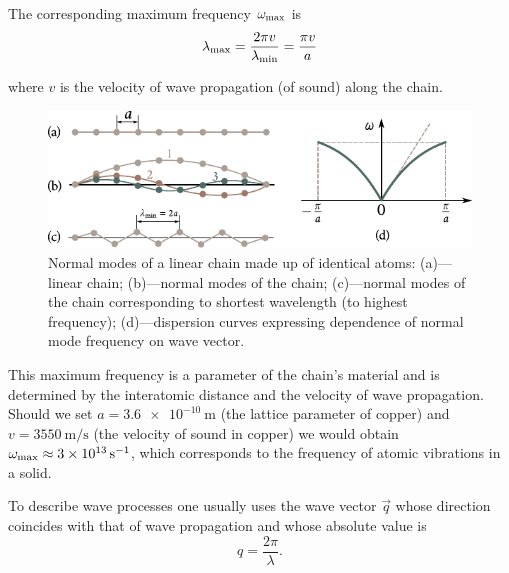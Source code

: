 \noindent
The corresponding maximum frequency $\omega_{\text{max}}$ is
\begin{equation}\label{eq:4_2}
    \lambda_{\text{max}} = \frac{2\pi v}{\lambda_{\text{min}}} = \frac{\pi v}{a}
\end{equation}

\noindent
where $v$ is the velocity of wave propagation (of sound) along the chain.

\begin{figure}[t]
	\begin{center}
		\includegraphics[scale=1.1]{figures/ch_04/fig_4_1.pdf}
		\caption[]{Normal modes of a linear chain made up of identical atoms: (a)---linear chain; (b)---normal modes of the chain; (c)---normal modes of the chain corresponding to shortest wavelength (to highest frequency); (d)---dispersion curves expressing dependence of normal mode frequency on wave vector.}
		\label{fig:4_1}
	\end{center}
	\vspace{-0.7cm}
\end{figure}

This maximum frequency is a parameter of the chain's material and is determined by the interatomic distance and the velocity of wave propagation. Should we set $a=\SI{3.6e-10}{\metre}$ (the lattice parameter of copper) and $v=\SI{3550}{\metre\per\second}$ (the velocity of sound in copper) we would obtain $\omega_{\text{max}}\approx\SI{3e13}{\per\second}$, which corresponds to the frequency of atomic vibrations in a solid.

To describe wave processes one usually uses the wave vector $\vec{q}$ whose direction coincides with that of wave propagation and whose absolute value is
\begin{equation}\label{eq:4_3}
    q = \frac{2\pi}{\lambda}.
\end{equation}

